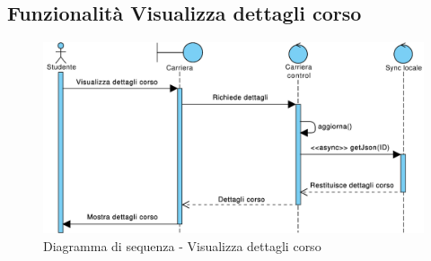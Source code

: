 \subsection{Funzionalità Visualizza dettagli corso}

\begin{figure}[h]
	\centering
	\includegraphics[width=6.5in]{imgs/gruppo1/sequence_diagrams/SD5_visualizza_dettagli_corso.pdf}
	\caption{Diagramma di sequenza - Visualizza dettagli corso}
	\label{diag:visualizzaDettagliCorsoSD}
\end{figure}
\newpage
\clearpage